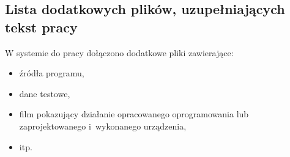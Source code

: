 \documentclass[a4paper,twoside,12pt]{book}
\begin{document}
\begin{appendices}
\chapter{Lista dodatkowych plików, uzupełniających tekst pracy} 


W systemie do pracy dołączono dodatkowe pliki zawierające:
\begin{itemize}
\item źródła programu,
\item dane testowe,
\item film pokazujący działanie opracowanego oprogramowania lub zaprojektowanego i~wykonanego urządzenia,
\item itp.
\end{itemize}


\listoffigures
{}
\listoftables
{}

\end{appendices}
\end{document}
